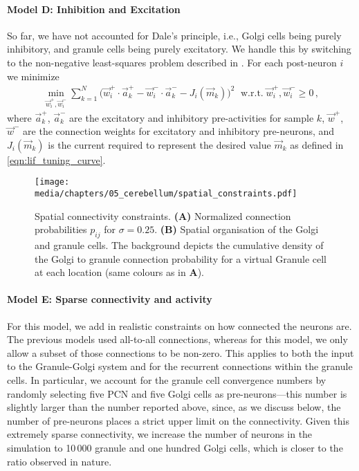 \paragraph{Model D: Inhibition and Excitation}
So far, we have not accounted for Dale's principle, i.e., Golgi cells being purely inhibitory, and granule cells being purely excitatory.
We handle this by switching to the non-negative least-squares problem described in \citet{stoeckel2021passive}. For each post-neuron $i$ we minimize
\begin{align*}
    \min_{\vec w_i^+, \vec w_i^-} \sum_{k = 1}^N \big( \vec w_i^+ \cdot \vec a^+_k - \vec w_i^- \cdot \vec a^-_k - J_i(\vec m_k) \big)^2 \; \text{ w.r.t.} \; \vec w_i^+, \vec w_i^- \geq 0 \,,
\end{align*}
where $\vec a^+_k$, $\vec a^-_k$ are the excitatory and inhibitory pre-activities for sample $k$, $\vec w^+$, $\vec w^-$ are the connection weights for excitatory and inhibitory pre-neurons, and $J_i(\vec m_k)$ is the current required to represent the desired value $\vec m_k$ as defined in \cref{eqn:lif_tuning_curve}.

\begin{figure}[t]
    \centering
    \texttt{[image: media/chapters/05\_cerebellum/spatial\_constraints.pdf]}
    \caption[Spatial connectivity constraints.]{Spatial connectivity constraints. \textbf{(A)} Normalized connection probabilities $p_{ij}$ for $\sigma=0.25$. \textbf{(B)} Spatial organisation of the Golgi and granule cells. The background depicts the cumulative density of the Golgi to granule connection probability for a virtual Granule cell at each location (same colours as in \textbf{A}).}
    \label{fig:spatial_constraints}
\end{figure}

\paragraph{Model E: Sparse connectivity and activity}
For this model, we add in realistic constraints on how connected the neurons are.
The previous models used all-to-all connections, whereas for this model, we only allow a subset of those connections to be non-zero.
This applies to both the input to the Granule-Golgi system and for the recurrent connections within the granule cells.  
In particular, we account for the granule cell convergence numbers by randomly selecting five PCN and five Golgi cells as pre-neurons---this number is slightly larger than the number reported above, since, as we discuss below, the number of pre-neurons places a strict upper limit on the connectivity. Given this extremely sparse connectivity, we increase the number of neurons in the simulation to 10\,000 granule and one hundred Golgi cells, which is closer to the ratio observed in nature.

